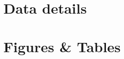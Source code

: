 \documentclass[12pt]{article}
\begin{document}
	\newpage
	\singlespacing
	
	
	\appendix
	\newpage
	
	\section{Data details}\label{a:data}
	
	\clearpage
	
	\section{Figures \& Tables}\label{a:FiguresTables}
	
	
\end{document}
